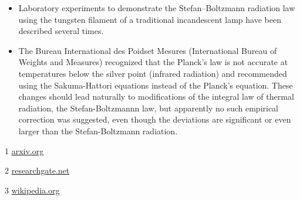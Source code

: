 \documentclass[a4paper, 12pt]{article}
\begin{document}
\begin{itemize}

    \item Laboratory experiments to demonstrate the Stefan–Boltzmann radiation law using the tungsten filament of a traditional incandescent lamp have been described several times.~\cite{Marcello Carla}

    \item The Bureau International des Poidset Mesures (International Bureau of Weights and Measures) recognized that the Planck’s law is not accurate at temperatures below the silver point (infrared radiation) and recommended using the Sakuma-Hattori equations instead of the Planck’s equation. These changes should lead naturally to modifications of the integral law of thermal radiation, the Stefan-Boltzmannn law, but apparently no such empirical correction was suggested, even though the deviations are significant or even larger than the Stefan-Boltzmann radiation.~\cite{Yuri V. Gusev}

\end{itemize}




1 \href{https://arxiv.org/pdf/1612.03199.pdf}{arxiv.org}

2 \href{https://www.researchgate.net/publication/258757261_Stefan-Boltzmann_law_for_the_tungsten_filament_of_a_light_bulb_Revisiting_the_experiment/link/5954d3ea0f7e9b2da1b3b8ab/download}{researchgate.net}

3 \href{https://en.wikipedia.org/wiki/Stefan%E2%80%93Boltzmann_law}{wikipedia.org}
\end{document}
